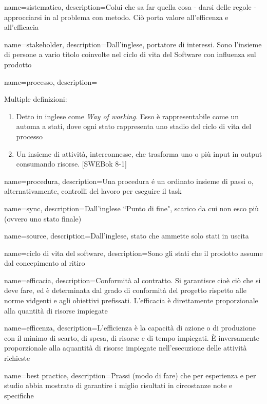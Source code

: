 {
name=sistematico,
description={Colui che sa far quella cosa - darsi delle regole - approcciarsi in al problema con metodo. Ci\`o porta valore all'efficenza e all'efficacia}
}

{
name=stakeholder,
description={Dall'inglese, portatore di interessi. Sono l'insieme di persone a vario titolo coinvolte nel ciclo di vita del Software con influenza sul prodotto}
}

{
name=processo, 
description={Multiple definizioni:
\begin{enumerate}
\item Detto in inglese come \textit{Way of working}. Esso \`e rappresentabile come un automa a stati, dove ogni stato rappresenta uno stadio del ciclo di vita del processo
\item Un insieme di attività, interconnesse, che trasforma uno o più input in output consumando risorse. [SWEBok 8-1]
\end{enumerate}
}
}

{
name=procedura,
description={Una procedura \'e un ordinato insieme di passi o, alternativamente, controlli del lavoro per eseguire il task}
}


{
name=sync,
description={Dall'inglese ``Punto di fine", scarico da cui non esco pi\`u (ovvero uno stato finale)}
}

{
name=source,
description={Dall'inglese, stato che ammette solo stati in uscita}
}

{
name=ciclo di vita del software,
description={Sono gli stati che il prodotto assume dal concepimento al ritiro}
}

{
name=efficacia,
description={Conformit\`a al contratto. Si garantisce cio\`e ci\`o che si deve fare, ed \`e determinata dal grado di conformit\`a del progetto rispetto alle norme vidgenti e agli obiettivi prefissati. L'efficacia \`e direttamente proporzionale alla quantit\`a di risorse impiegate}
}

{
name=efficenza,
description={L'efficienza \`e la capacit\`a di azione o di produzione con il minimo di scarto, di spesa, di risorse e di tempo impiegati. \`E inversamente proporzionale alla aquantit\`a di risorse impiegate nell'esecuzione delle attivit\`a richieste}
}

{
name=best practice,
description={Prassi (modo di fare) che per esperienza e per studio abbia mostrato di garantire i miglio risultati in circostanze note e specifiche}
}

